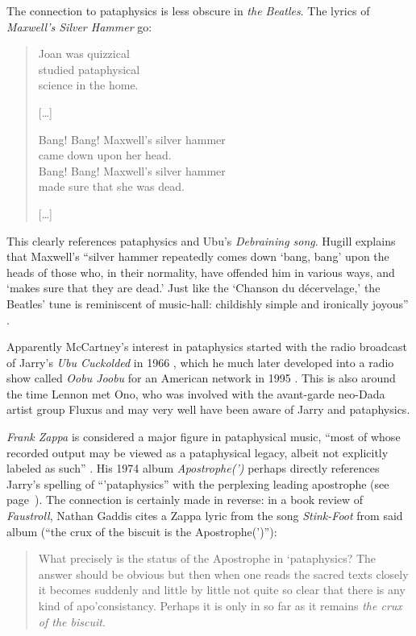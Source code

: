 The connection to pataphysics is less obscure in \emph{the Beatles}. The lyrics of \textit{Maxwell's Silver Hammer} go: 

\begin{quotation}
  Joan was quizzical\\
  studied pataphysical\\
  science in the home.

  [\ldots]

  Bang! Bang! Maxwell's silver hammer\\
  came down upon her head.\\
  Bang! Bang! Maxwell's silver hammer\\
  made sure that she was dead.

  [\ldots]
\end{quotation}

This clearly references pataphysics and Ubu's \textit{Debraining song}. Hugill explains that Maxwell's ``silver hammer repeatedly comes down `bang, bang' upon the heads of those who, in their normality, have offended him in various ways, and `makes sure that they are dead.' Just like the `Chanson du décervelage,' the Beatles’ tune is reminiscent of music-hall: childishly simple and ironically joyous'' \autocite*{Hugill2012}. 

Apparently McCartney’s interest in pataphysics started with the radio broadcast of Jarry's \textit{Ubu Cuckolded} in 1966 \autocite[Miles 1997, as cited in][]{Hugill2012}, which he much later developed into a radio show called \textit{Oobu Joobu} for an American network in 1995 \autocite{Hugill2012}. This is also around the time Lennon met Ono, who was involved with the avant-garde neo-Dada artist group Fluxus and may very well have been aware of Jarry and pataphysics.

\emph{Frank Zappa} is considered a major figure in pataphysical music, ``most of whose recorded output may be viewed as a pataphysical legacy, albeit not explicitly labeled as such'' \autocite{Hugill2012}. His 1974 album \textit{Apostrophe(')} \autocite*{Zappa1974} perhaps directly references Jarry's spelling of ``'pataphysics'' with the perplexing leading apostrophe (see page~\pageref{s:apostrophe}). The connection is certainly made in reverse: in a book review of \textit{Faustroll}, Nathan Gaddis cites a Zappa lyric from the song \textit{Stink-Foot} from said album (``the crux of the biscuit is the Apostrophe(')''):

\begin{quotation}
  What precisely is the status of the Apostrophe in ‘pataphysics? The answer should be obvious but then when one reads the sacred texts closely it becomes suddenly and little by little not quite so clear that there is any kind of apo’consistancy. Perhaps it is only in so far as it remains \emph{the crux of the biscuit}. 
\end{quotation}

